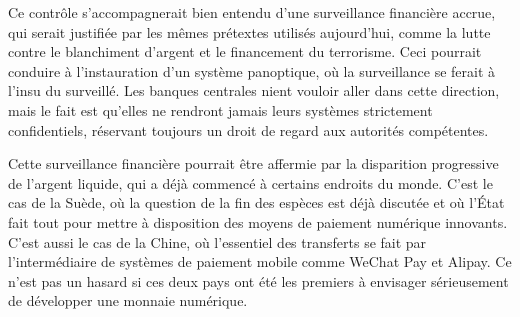 Ce contrôle s'accompagnerait bien entendu d'une surveillance financière accrue, qui serait justifiée par les mêmes prétextes utilisés aujourd'hui, comme la lutte contre le blanchiment d'argent et le financement du terrorisme. Ceci pourrait conduire à l'instauration d'un système panoptique, où la surveillance se ferait à l'insu du surveillé. Les banques centrales nient vouloir aller dans cette direction, mais le fait est qu'elles ne rendront jamais leurs systèmes strictement confidentiels, réservant toujours un droit de regard aux autorités compétentes. %

Cette surveillance financière pourrait être affermie par la disparition progressive de l'argent liquide, qui a déjà commencé à certains endroits du monde. C'est le cas de la Suède, où la question de la fin des espèces est déjà discutée et où l'État fait tout pour mettre à disposition des moyens de paiement numérique innovants. C'est aussi le cas de la Chine, où l'essentiel des transferts se fait par l'intermédiaire de systèmes de paiement mobile comme WeChat Pay et Alipay. Ce n'est pas un hasard si ces deux pays ont été les premiers à envisager sérieusement de développer une monnaie numérique. %

